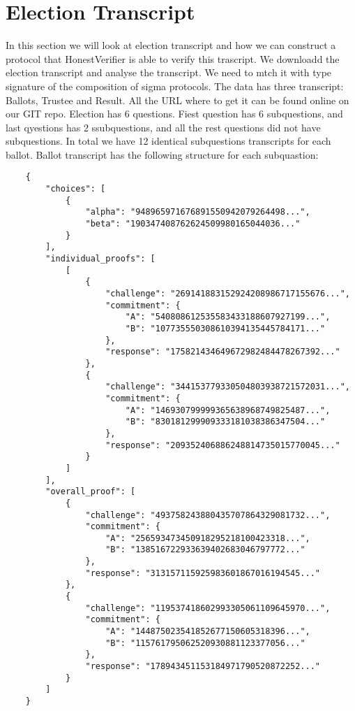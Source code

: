 \section{Election Transcript}
In this section we will look at election transcript and how we can construct a protocol that HonestVerifier is able to verify this trascript.
We downloadd the election transcript and analyse the transcript. We need to mtch it with type signature of the composition of sigma protocols.
The data has three transcript: Ballots, Trustee and Result. All the URL where to get it can be found online on our GIT repo. 
Election has 6 questions. Fiest question has 6 subquestions, and last qyestions has 2 ssubquestions, and all the rest questions 
did not have subquestions. In total we have 12 identical subquestions transcripts for each ballot. 
Ballot transcript has the following structure for each subquastion:
\begin{verbatim}
    {
        "choices": [
            {
                "alpha": "948965971676891550942079264498...",
                "beta": "190347408762624509980165044036..."
            }
        ],
        "individual_proofs": [
            [
                {
                    "challenge": "269141883152924208986717155676...",
                    "commitment": {
                        "A": "540808612535583433188607927199...",
                        "B": "107735550308610394135445784171..."
                    },
                    "response": "175821434649672982484478267392..."
                },
                {
                    "challenge": "344153779330504803938721572031...",
                    "commitment": {
                        "A": "146930799999365638968749825487...",
                        "B": "830181299909333181038386347504..."
                    },
                    "response": "209352406886248814735015770045..."
                }
            ]
        ],
        "overall_proof": [
            {
                "challenge": "493758243880435707864329081732...",
                "commitment": {
                    "A": "256593473450918295218100423318...",
                    "B": "138516722933639402683046797772..."
                },
                "response": "313157115925983601867016194545..."
            },
            {
                "challenge": "119537418602993305061109645970...",
                "commitment": {
                    "A": "144875023541852677150605318396...",
                    "B": "115761795062520930881123377056..."
                },
                "response": "178943451153184971790520872252..."
            }
        ]
    }
    
    \end{verbatim}
    
